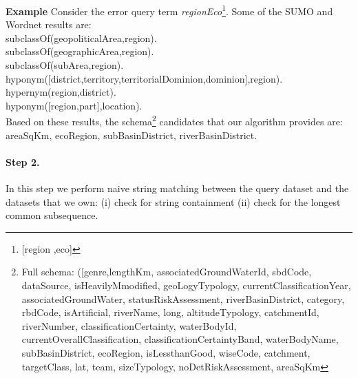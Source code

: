 \documentclass[a4paper,10pt]{article}
\begin{document}
\textbf{Example} Consider the error query term \textit{regionEco}\footnote{[region  ,eco]}. Some of the SUMO and Wordnet results are:\\
\indent subclassOf(geopoliticalArea,region). 
\\ \indent subclassOf(geographicArea,region). 
\\ \indent subclassOf(subArea,region). 
\\ \indent hyponym([district,territory,territorialDominion,dominion],region). 
\\ \indent hypernym(region,district).
\\ \indent hyponym([region,part],location). \\
Based on these results, the schema\footnote{Full schema: ([genre,lengthKm, associatedGroundWaterId, 
sbdCode, dataSource, isHeavilyMmodified, geoLogyTypology, currentClassificationYear, associatedGroundWater,  statusRiskAssessment, riverBasinDistrict, category, rbdCode, isArtificial, riverName, long, altitudeTypology, catchmentId, riverNumber, classificationCertainty, waterBodyId, currentOverallClassification,  classificationCertaintyBand, waterBodyName, subBasinDistrict, ecoRegion, isLessthanGood, wiseCode, catchment, targetClass, lat, team, sizeTypology, noDetRiskAssessment, areaSqKm} candidates that our algorithm provides are: \\
areaSqKm, ecoRegion, subBasinDistrict, riverBasinDistrict.

 			\paragraph{Step 2.}	
 			In this step we perform naive string matching between the query dataset and the datasets that we own:
 (i) check for string containment (ii) check for the  longest common subsequence. 
\end{document}
